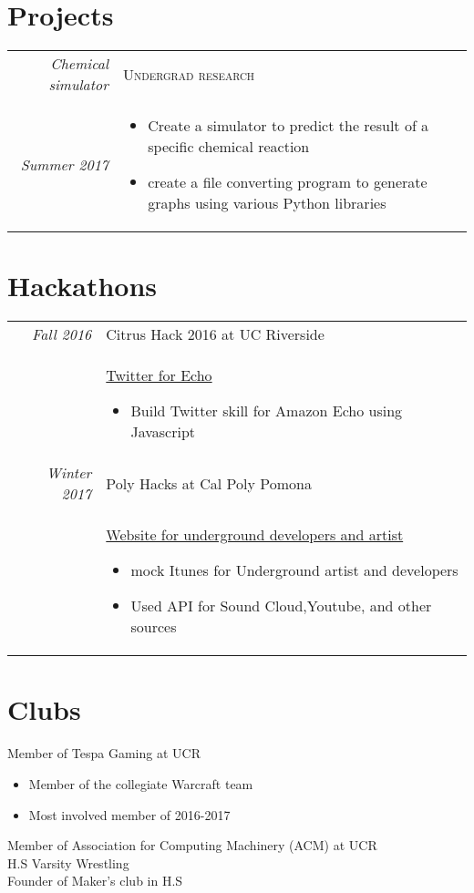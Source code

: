 \documentclass[a4paper,12pt]{article}
\begin{document}
\section{Projects}

\begin{tabular}{r|p{11cm}}
 \emph{Chemical simulator} & \textsc{Undergrad research} \\\emph{Summer 2017}&\footnotesize\begin{itemize}
  \item Create a simulator to predict the result of a specific chemical reaction
  \item create a file converting program to generate graphs using various Python libraries

\end{itemize}


\end{tabular}


\section{Hackathons}
\begin{tabular}{r|p{11cm}}
 \emph{Fall 2016} & Citrus Hack 2016 at UC Riverside\\
    &\href{https://github.com/jluo117/echo_twitter_program}{Twitter for Echo}
 \footnotesize\begin{itemize}
  \item Build Twitter skill for Amazon Echo using Javascript
\end{itemize}\\
\emph{Winter 2017} & Poly Hacks at Cal Poly Pomona\\
    & \href{https://github.com/jluo117/PolyHacks}{Website for underground developers and artist}
 \footnotesize\begin{itemize}
  \item mock Itunes for Underground artist and developers
  \item Used API for Sound Cloud,Youtube, and other sources
\end{itemize}
\end{tabular}
\section{Clubs}
    Member of Tespa Gaming at UCR
    \begin{itemize}
        \item Member of the collegiate Warcraft team
        \item Most involved member of 2016-2017
    \end{itemize}
    Member of Association for Computing Machinery (ACM) at UCR\\
    H.S Varsity Wrestling\\
    Founder of Maker's club in H.S\\
\end{document}
